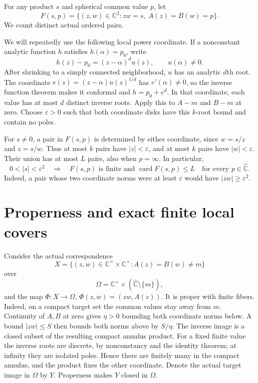 \documentclass[11pt]{article}
\numberwithin{equation}{section}
\newcommand{\C}{\mathbb C}
\newcommand{\Cs}{\C^{\times}}
\newcommand{\Chat}{\widehat{\C}}
\newcommand{\card}{\operatorname{card}}
\begin{document}
For any product $s$ and spherical common value $p$, let
\[
 F(s,p)=\{(z,w)\in\C^2:zw=s,\ A(z)=B(w)=p\}.
\]
We count distinct actual ordered pairs.

We will repeatedly use the following local power coordinate. If a
nonconstant analytic function $h$ satisfies $h(\alpha)=p_0$, write
\[
 h(z)-p_0=(z-\alpha)^d u(z),\qquad u(\alpha)\ne0.
\]
After shrinking to a simply connected neighborhood, $u$ has an analytic
$d$th root. The coordinate $e(z)=(z-\alpha)u(z)^{1/d}$ has
$e'(\alpha)\ne0$, so the inverse function theorem makes it conformal and
$h=p_0+e^d$. In that coordinate, each value has at most $d$ distinct
inverse roots. Apply this to $A-m$ and $B-m$ at zero. Choose
$\varepsilon>0$ such that both coordinate disks have this $k$-root bound
and contain no poles.

For $s\ne0$, a pair in $F(s,p)$ is determined by either coordinate, since
$w=s/z$ and $z=s/w$. Thus at most $k$ pairs have $|z|<\varepsilon$, and
at most $k$ pairs have $|w|<\varepsilon$. Their union has at most $L$ pairs,
also when $p=\infty$. In particular,
\begin{equation}\label{eq:small}
 0<|s|<\varepsilon^2\quad\Longrightarrow\quad
 F(s,p)\text{ is finite and }\card F(s,p)\le L
 \quad\text{for every }p\in\Chat.
\end{equation}
Indeed, a pair whose two coordinate norms were at least $\varepsilon$
would have $|zw|\ge\varepsilon^2$.

\section{Properness and exact finite local covers}\label{sec:covers}

Consider the actual correspondence
\[
 X=\{(z,w)\in\Cs\times\Cs:A(z)=B(w)\ne m\}
\]
over
\[
 \Omega=\Cs\times(\Chat\setminus\{m\}),
\]
and the map $\Phi:X\to\Omega$, $\Phi(z,w)=(zw,A(z))$.
It is proper with finite fibers. Indeed, on a compact target set the common
values stay away from $m$. Continuity of $A,B$ at zero gives $\eta>0$
bounding both coordinate norms below. A bound $|zw|\le S$ then bounds
both norms above by $S/\eta$. The inverse image is a closed subset of the
resulting compact annulus product. For a fixed finite value the inverse
roots are discrete, by nonconstancy and the identity theorem; at infinity
they are isolated poles. Hence there are finitely many in the compact
annulus, and the product fixes the other coordinate. Denote the actual
target image in $\Omega$ by $Y$. Properness makes $Y$ closed in $\Omega$.
\end{document}
